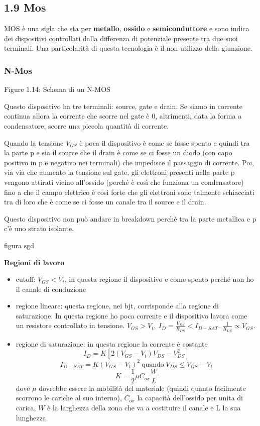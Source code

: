\documentclass[
]{article}
\providecommand{\tightlist}{%
  \setlength{\itemsep}{0pt}\setlength{\parskip}{0pt}}
\begin{document}
\subsection{1.9 Mos}\label{mos}

MOS è una sigla che sta per \textbf{metallo}, \textbf{ossido} e
\textbf{semiconduttore} e sono indica dei dispositivi controllati dalla
differenza di potenziale presente tra due suoi terminali. Una
particolarità di questa tecnologia è il non utilizzo della giunzione.

\subsubsection{N-Mos}\label{n-mos}

Figure 1.14: Schema di un N-MOS

Questo dispositivo ha tre terminali: source, gate e drain. Se siamo in
corrente continua allora la corrente che scorre nel gate è 0,
altrimenti, data la forma a condensatore, scorre una piccola quantità di
corrente.

Quando la tensione \(V_{GS}\) è poca il dispositivo è come se fosse
spento e quindi tra la parte p e sia il source che il drain è come se ci
fosse un diodo (con capo positivo in p e negativo nei terminali) che
impedisce il passaggio di corrente. Poi, via via che aumento la tensione
sul gate, gli elettroni presenti nella parte p vengono attirati vicino
all'ossido (perché è così che funziona un condensatore) fino a che il
campo elettrico è così forte che gli elettroni sono talmente schiacciati
tra di loro che è come se ci fosse un canale tra il source e il drain.

Questo dispositivo non può andare in breakdown perché tra la parte
metallica e p c'è uno strato isolante.

figura sgd

\textbf{Regioni di lavoro}

\begin{itemize}
\tightlist
\item
  cutoff: \(V_{GS}<V_{t}\), in questa regione il dispositivo e come
  spento perché non ho il canale di conduzione
\item
  regione lineare: questa regione, nei bjt, corrisponde alla regione di
  saturazione. In questa regione ho poca corrente e il dispositivo
  lavora come un resistore controllato in tensione. \(V_{GS}>V_{t},\
  I_{D}=\frac{V_{DS}}{R_{DS}}<I_{D-SAT}\).
  \(\frac{1}{R_{DS}}\propto V_{GS}\).
\item
  regione di saturazione: in questa regione la corrente è costante
  \[I_{D}
  = K[2(V_{GS}-V_{t})V_{DS}-V_{DS}^{2}]\]
  \[I_{D-SAT} = K(V_{GS}-V_{t})^{2}\ \text{quando}\
  V_{DS}\leq V_{GS}-V_{t}\] \[K = \frac{1}{2}\mu C_{ox}\frac{W}{L}\]
  dove \(\mu\) dovrebbe essere la mobilità del materiale (quindi quanto
  facilmente scorrono le cariche al suo interno), \(C_{ox}\) la capacità
  dell'ossido per unita di carica, \(W\) è la larghezza della zona che
  va a costituire il canale e L la sua lunghezza.
\end{itemize}
\end{document}
